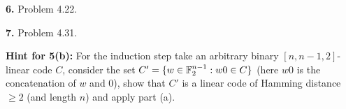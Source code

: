 \documentclass[12pt]{amsart}
\begin{document}
{\bf 6.} Problem 4.22.

{\bf 7.} Problem 4.31.


\newpage
{\bf Hint for 5(b):} For the induction step take an arbitrary binary  $[n,n-1,2]$-linear code $C$, consider the set $C'=\{w\in{\mathbb F}_2^{n-1}: w0\in C\}$
(here $w0$ is the concatenation of $w$ and $0$), show that $C'$ is a linear code of Hamming distance $\geq 2$ (and length $n$) and apply part (a).
\end{document}
